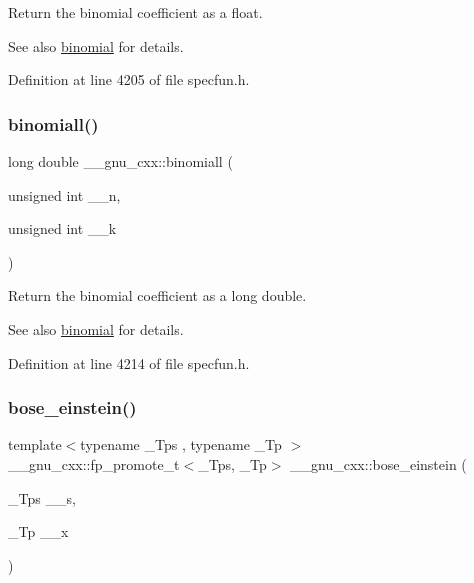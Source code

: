 Return the binomial coefficient as a {\ttfamily float}.

\begin{DoxySeeAlso}{See also}
\hyperlink{group__gnu__math__spec__func_gabd0cf6e3f1e1d36c4c45f118e34a5ca2}{binomial} for details. 
\end{DoxySeeAlso}


Definition at line 4205 of file specfun.\+h.

\mbox{\label{group__gnu__math__spec__func_ga57602195f9215f735793c11d3210ac93}} 
\subsubsection{\texorpdfstring{binomiall()}{binomiall()}}
{\footnotesize\ttfamily long double \+\_\+\+\_\+gnu\+\_\+cxx\+::binomiall (\begin{DoxyParamCaption}\item[{unsigned int}]{\+\_\+\+\_\+n,  }\item[{unsigned int}]{\+\_\+\+\_\+k }\end{DoxyParamCaption})\hspace{0.3cm}{\ttfamily [inline]}}

Return the binomial coefficient as a {\ttfamily long double}.

\begin{DoxySeeAlso}{See also}
\hyperlink{group__gnu__math__spec__func_gabd0cf6e3f1e1d36c4c45f118e34a5ca2}{binomial} for details. 
\end{DoxySeeAlso}


Definition at line 4214 of file specfun.\+h.

\mbox{\label{group__gnu__math__spec__func_gae8135b6861a48f2cee2e692093a17102}} 
\subsubsection{\texorpdfstring{bose\+\_\+einstein()}{bose\_einstein()}}
{\footnotesize\ttfamily template$<$typename \+\_\+\+Tps , typename \+\_\+\+Tp $>$ \\
\+\_\+\+\_\+gnu\+\_\+cxx\+::fp\+\_\+promote\+\_\+t$<$\+\_\+\+Tps, \+\_\+\+Tp$>$ \+\_\+\+\_\+gnu\+\_\+cxx\+::bose\+\_\+einstein (\begin{DoxyParamCaption}\item[{\+\_\+\+Tps}]{\+\_\+\+\_\+s,  }\item[{\+\_\+\+Tp}]{\+\_\+\+\_\+x }\end{DoxyParamCaption})\hspace{0.3cm}{\ttfamily [inline]}}

